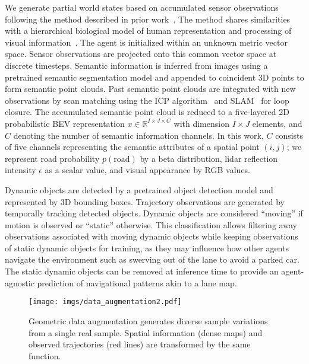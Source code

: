\documentclass[letterpaper, 10 pt, conference]{ieeeconf}
\begin{document}
We generate partial world states based on accumulated sensor observations following the method described in prior work~\cite{karlsson2023pred_wm}. The method shares similarities with a hierarchical biological model of human representation and processing of visual information~\cite{mar1982human_hierarchical_vision_repr}.
The agent is initialized within an unknown metric vector space. Sensor observations are projected onto this common vector space at discrete timesteps. Semantic information is inferred from images using a pretrained semantic segmentation model and appended to coincident 3D points to form semantic point clouds.
Past semantic point clouds are integrated with new observations by scan matching using the ICP algorithm~\cite{vizzo2022kiss-icp} and SLAM~\cite{smith1986slam} for loop closure. The accumulated semantic point cloud is reduced to a five-layered 2D probabilistic BEV representation $x \in \mathbb{R}^{I \times J \times C}$ with dimension $I \times J$ elements, and $C$ denoting the number of semantic information channels. In this work, $C$ consists of five channels representing the semantic attributes of a spatial point $(i,j)$; we represent road probability $p(\text{road})$ by a beta distribution, lidar reflection intensity $\epsilon$ as a scalar value, and visual appearance by RGB values.


Dynamic objects are detected by a pretrained object detection model and represented by 3D bounding boxes. Trajectory observations are generated by temporally tracking detected objects. 
Dynamic objects are considered ``moving'' if motion is observed or ``static'' otherwise. This classification allows filtering away observations associated with moving dynamic objects while keeping observations of static dynamic objects for training, as they may influence how other agents navigate the environment such as swerving out of the lane to avoid a parked car. The static dynamic objects can be removed at inference time to provide an agent-agnostic prediction of navigational patterns akin to a lane map.

\begin{figure}\centering
\texttt{[image: imgs/data\_augmentation2.pdf]}
\vspace{-8mm}
\caption{Geometric data augmentation generates diverse sample variations from a single real sample. Spatial information (dense maps) and observed trajectories (red lines) are transformed by the same function.}
\label{fig:data_aug}
\vspace{-5mm}
\end{figure}
\end{document}
